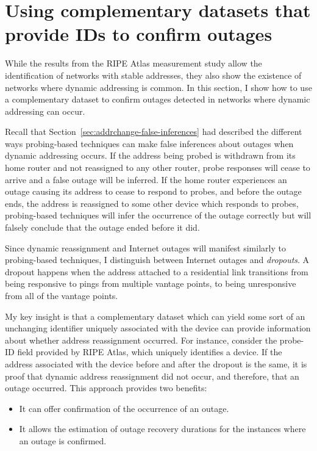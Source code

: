 

\section{Using complementary datasets that provide IDs to confirm outages}

\label{sec:complementary-ns}

While the results from the RIPE Atlas measurement study allow the identification of networks with stable addresses, they also show the existence of networks where dynamic addressing is common. In this section, I show how to use a complementary dataset to confirm outages detected in networks where dynamic addressing can occur.

Recall that Section~\ref{sec:addrchange-false-inferences} had described the different ways probing-based techniques can make false inferences about outages when dynamic addressing occurs. If the address being probed is withdrawn from its home router and not reassigned to any other router, probe responses will cease to arrive and a false outage will be inferred. If the home router experiences an outage causing its address to cease to respond to probes, and before the outage ends, the address is reassigned to some other device which responds to probes, probing-based techniques will infer the occurrence of the outage correctly but will falsely conclude that the outage ended before it did.

Since dynamic reassignment and Internet outages will manifest similarly to probing-based techniques, I distinguish between Internet outages and \emph{dropouts}. A dropout happens when the address attached to a residential link transitions from being responsive to pings from multiple vantage points, to being unresponsive from all of the vantage points.

My key insight is that a complementary dataset which can yield some sort of an unchanging identifier uniquely associated with the device can provide information about whether address reassignment occurred. For instance, consider the probe-ID field provided by RIPE Atlas, which uniquely identifies a device. If the address associated with the device before and after the dropout is the same, it is proof that dynamic address reassignment did not occur, and therefore, that an outage occurred. This approach provides two benefits:

\begin{itemize}

\item{It can offer confirmation of the occurrence of an outage.}

\item{It allows the estimation of outage recovery durations for the instances where an outage is confirmed.}

\end{itemize}


